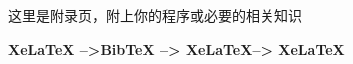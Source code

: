 \Appendix
这里是附录页，附上你的程序或必要的相关知识

{\bf\heiti\color{red}{若要生成目录和参考文献的编译方式:} \color{black}XeLaTeX -->BibTeX --> XeLaTeX--> XeLaTeX}


\clearpage